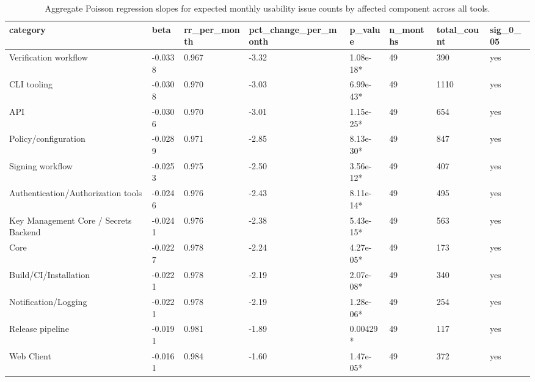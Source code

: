 \begin{table}[t]
\centering
\caption{Aggregate Poisson regression slopes for expected monthly usability issue counts by affected component across all tools.}
\label{tab:poisson-aggregate-component}
\scriptsize
\begin{tabular}{llllllll}
\hline
category & beta & rr\_per\_month & pct\_change\_per\_month & p\_value & n\_months & total\_count & sig\_0\_05 \\
\hline
Verification workflow & -0.0338 & 0.967 & -3.32 & 1.08e-18* & 49 & 390 & yes \\
CLI tooling & -0.0308 & 0.970 & -3.03 & 6.99e-43* & 49 & 1110 & yes \\
API & -0.0306 & 0.970 & -3.01 & 1.15e-25* & 49 & 654 & yes \\
Policy/configuration & -0.0289 & 0.971 & -2.85 & 8.13e-30* & 49 & 847 & yes \\
Signing workflow & -0.0253 & 0.975 & -2.50 & 3.56e-12* & 49 & 407 & yes \\
Authentication/Authorization tools & -0.0246 & 0.976 & -2.43 & 8.11e-14* & 49 & 495 & yes \\
Key Management Core / Secrets Backend & -0.0241 & 0.976 & -2.38 & 5.43e-15* & 49 & 563 & yes \\
Core & -0.0227 & 0.978 & -2.24 & 4.27e-05* & 49 & 173 & yes \\
Build/CI/Installation & -0.0221 & 0.978 & -2.19 & 2.07e-08* & 49 & 340 & yes \\
Notification/Logging & -0.0221 & 0.978 & -2.19 & 1.28e-06* & 49 & 254 & yes \\
Release pipeline & -0.0191 & 0.981 & -1.89 & 0.00429* & 49 & 117 & yes \\
Web Client & -0.0161 & 0.984 & -1.60 & 1.47e-05* & 49 & 372 & yes \\
\hline
\end{tabular}
\end{table}
